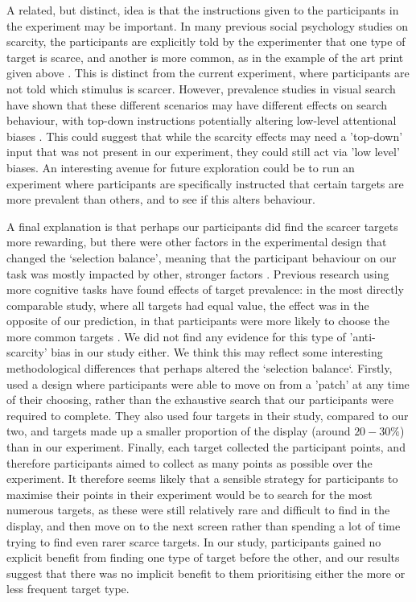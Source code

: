 \documentclass[12pt]{article}
\begin{document}
A related, but distinct, idea is that the instructions given to the participants in the experiment may be important. In many previous social psychology studies on scarcity, the participants are explicitly told by the experimenter that one type of target is scarce, and another is more common, as in the example of the art print given above \citep{lynn1989scarcity}. This is distinct from the current experiment, where participants are not told which stimulus is scarcer. However, prevalence studies in visual search have shown that these different scenarios may have different effects on search behaviour, with top-down instructions potentially altering low-level attentional biases \citep{horowitz2017prevalence}.  This could suggest that while the scarcity effects may need a 'top-down' input that was not present in our experiment, they could still act via 'low level' biases. An interesting avenue for future exploration could be to run an experiment where participants are specifically instructed that certain targets are more prevalent than others, and to see if this alters behaviour. 

A final explanation is that perhaps our participants did find the scarcer targets more rewarding, but there were other factors in the experimental design that changed the `selection balance', meaning that the participant behaviour on our task was mostly impacted by other, stronger factors \citep{tagu2022selection}. Previous research using more cognitive tasks have found effects of target prevalence: in the most directly comparable study, where all targets had equal value, the effect was in the opposite of our prediction, in that participants were more likely to choose the more common targets \citep{wolfe2018hybrid}. We did not find any evidence for this type of 'anti-scarcity' bias in our study either. We think this may reflect some interesting methodological differences that perhaps altered the `selection balance`. Firstly, \cite{wolfe2018hybrid} used a design where participants were able to move on from a 'patch' at any time of their choosing, rather than the exhaustive search that our participants were required to complete. They also used four targets in their study, compared to our two, and targets made up a smaller proportion of the display (around $20-30\%$) than in our experiment. Finally, each target collected the participant points, and therefore participants aimed to collect as many points as possible over the experiment. It therefore seems likely that a sensible strategy for participants to maximise their points in their experiment would be to search for the most numerous targets, as these were still relatively rare and difficult to find in the display, and then move on to the next screen rather than spending a lot of time trying to find even rarer scarce targets. In our study, participants gained no explicit benefit from finding one type of target before the other, and our results suggest that there was no implicit benefit to them prioritising either the more or less frequent target type.
\end{document}
